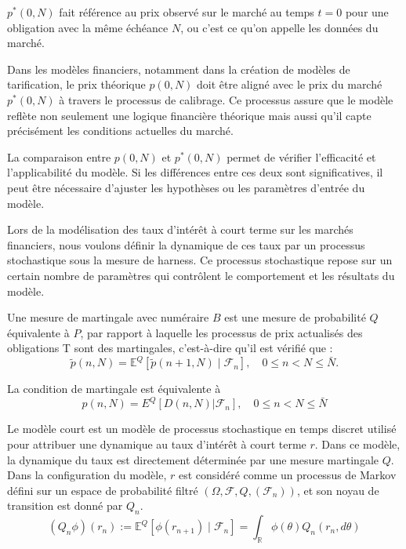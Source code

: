 \( p^*(0, N) \) fait référence au prix observé sur le marché au temps \( t=0 \) pour une obligation avec la même échéance \( N \), ou c'est ce qu'on appelle les données du marché.

Dans les modèles financiers, notamment dans la création de modèles de tarification, le prix théorique \( p(0, N) \) doit être aligné avec le prix du marché \( p^*(0, N) \) à travers le processus de calibrage. Ce processus assure que le modèle reflète non seulement une logique financière théorique mais aussi qu'il capte précisément les conditions actuelles du marché.

La comparaison entre \( p(0, N) \) et \( p^*(0, N) \) permet de vérifier l'efficacité et l'applicabilité du modèle. Si les différences entre ces deux sont significatives, il peut être nécessaire d'ajuster les hypothèses ou les paramètres d'entrée du modèle.

Lors de la modélisation des taux d'intérêt à court terme sur les marchés financiers, nous voulons définir la dynamique de ces taux par un processus stochastique sous la mesure de harness. Ce processus stochastique repose sur un certain nombre de paramètres qui contrôlent le comportement et les résultats du modèle.

\begin{defn}
Une mesure de martingale avec numéraire \( B \) est une mesure de probabilité \( Q \) équivalente à \( P \), par rapport à laquelle les processus de prix actualisés des obligations T sont des martingales, c'est-à-dire qu'il est vérifié que :
\[
\tilde{p}(n, N) = \mathbb{E}^Q[\tilde{p}(n + 1, N) \mid \mathcal{F}_n], \quad 0 \leq n < N \leq \bar{N}.
\]
\end{defn}

La condition de martingale est équivalente à
\begin{equation}
    p(n,N) = E^Q[D(n,N)|\mathcal{F}_n], \quad 0 \leq n < N \leq \bar{N}
\end{equation}


Le modèle court est un modèle de processus stochastique en temps discret utilisé pour attribuer une dynamique au taux d'intérêt à court terme \( r \). Dans ce modèle, la dynamique du taux est directement déterminée par une mesure martingale \( Q \). Dans la configuration du modèle, \( r \) est considéré comme un processus de Markov défini sur un espace de probabilité filtré \( (\Omega, \mathcal{F}, Q, (\mathcal{F}_n)) \), et son noyau de transition est donné par \( Q_n \).
\[
(Q_n \phi)(r_n) := \mathbb{E}^Q[\phi(r_{n+1}) \mid \mathcal{F}_n] = \int_{\mathbb{R}} \phi(\theta) Q_n (r_n, d\theta)
\]

